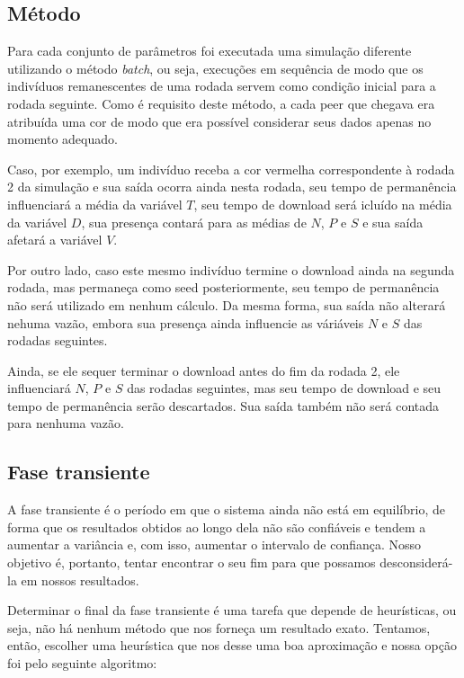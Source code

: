\documentclass[a4paper,10pt]{article}
\begin{document}
\subsection{Método}

Para cada conjunto de parâmetros foi executada uma simulação diferente utilizando o método \textit{batch}, ou seja, execuções em sequência de modo que os indivíduos remanescentes de uma rodada servem como condição inicial para a rodada seguinte. Como é requisito deste método, a cada peer que chegava era atribuída uma cor de modo que era possível considerar seus dados apenas no momento adequado.

Caso, por exemplo, um indivíduo receba a cor vermelha correspondente à rodada 2 da simulação e sua saída ocorra ainda nesta rodada, seu tempo de permanência influenciará a média da variável $T$, seu tempo de download será icluído na média da variável $D$, sua presença contará para as médias de $N$, $P$ e $S$ e sua saída afetará a variável $V$.

Por outro lado, caso este mesmo indivíduo termine o download ainda na segunda rodada, mas permaneça como seed posteriormente, seu tempo de permanência não será utilizado em nenhum cálculo. Da mesma forma, sua saída não alterará nehuma vazão, embora sua presença ainda influencie as váriáveis $N$ e $S$ das rodadas seguintes.

Ainda, se ele sequer terminar o download antes do fim da rodada 2, ele influenciará $N$, $P$ e $S$ das rodadas seguintes, mas seu tempo de download e seu tempo de permanência serão descartados. Sua saída também não será contada para nenhuma vazão.

\subsection{Fase transiente} %

A fase transiente é o período em que o sistema ainda não está em equilíbrio, de forma que os resultados obtidos ao longo dela não são confiáveis e tendem a aumentar a variância e, com isso, aumentar o intervalo de confiança. Nosso objetivo é, portanto, tentar encontrar o seu fim para que possamos desconsiderá-la em nossos resultados.

Determinar o final da fase transiente é uma tarefa que depende de heurísticas, ou seja, não há nenhum método que nos forneça um resultado exato. Tentamos, então, escolher uma heurística que nos desse uma boa aproximação e nossa opção foi pelo seguinte algoritmo:
\end{document}

